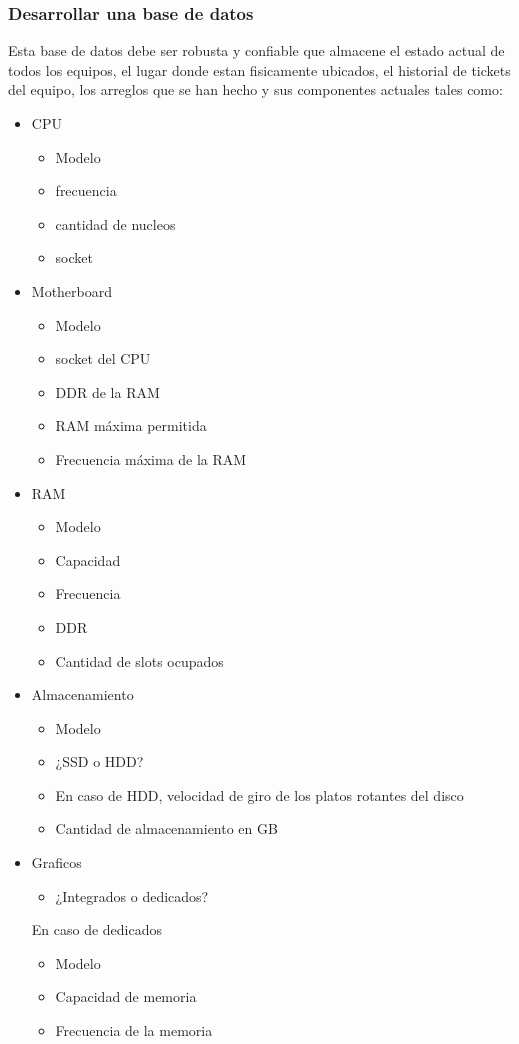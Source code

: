 \documentclass{article}
\begin{document}
		\subsubsection{Desarrollar una base de datos}
			Esta base de datos debe ser robusta y confiable que almacene el estado actual de todos los equipos, el lugar donde
			estan fisicamente ubicados, el historial de tickets del equipo,
			los arreglos que se han hecho y sus componentes actuales tales como:
			\begin{itemize}
			\item CPU
				\begin{itemize}
				\item Modelo
				\item frecuencia
				\item cantidad de nucleos
				\item socket
				\end{itemize}
			
			\item Motherboard
				\begin{itemize}
				\item Modelo
				\item socket del CPU
				\item DDR de la RAM
				\item RAM máxima permitida
				\item Frecuencia máxima de la RAM
				\end{itemize}
			
			\item RAM
				\begin{itemize}
				\item Modelo
				\item Capacidad
				\item Frecuencia
				\item DDR
				\item Cantidad de slots ocupados
				\end{itemize}
			
			\item Almacenamiento
				\begin{itemize}
				\item Modelo
				\item ¿SSD o HDD?
				\item En caso de HDD, velocidad de giro de los platos rotantes del disco 
				\item Cantidad de almacenamiento en GB
				\end{itemize}
			
			\item Graficos
				\begin{itemize}
				\item ¿Integrados o dedicados?
				\end{itemize}		
										
				En caso de dedicados
				\begin{itemize}
				\item Modelo
				\item Capacidad de memoria
				\item Frecuencia de la memoria
				\end{itemize}
			\end{itemize}
			
\end{document}
